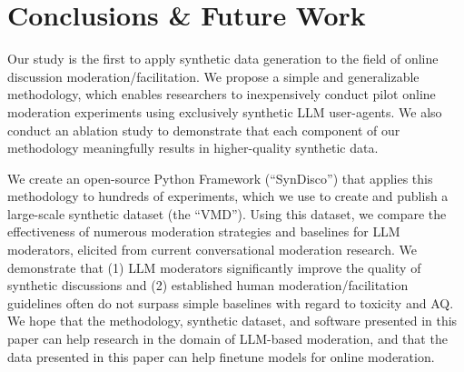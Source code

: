 %
\section{Conclusions \& Future Work}

Our study is the first to apply synthetic data generation to the field of online discussion moderation/facilitation. We propose a simple and generalizable methodology, which enables researchers to inexpensively conduct pilot online moderation experiments using exclusively synthetic \ac{LLM} user-agents. We also conduct an ablation study to demonstrate that each component of our methodology meaningfully results in higher-quality synthetic data.

We create an open-source Python Framework (“SynDisco”) that applies this methodology to hundreds of experiments, which we use to create and publish a large-scale synthetic dataset (the “\acf{VMD}”). Using this dataset, we compare the effectiveness of numerous moderation strategies and baselines  for \ac{LLM} moderators, elicited from current conversational moderation research. We demonstrate that (1) \ac{LLM} moderators significantly improve the quality of synthetic discussions and (2) established human moderation/facilitation guidelines often do not surpass simple baselines with regard to toxicity and \ac{AQ}. We hope that the methodology, synthetic dataset, and software presented in this paper can help research in the domain of \ac{LLM}-based moderation, and that the data presented in this paper can help finetune models for online moderation.
